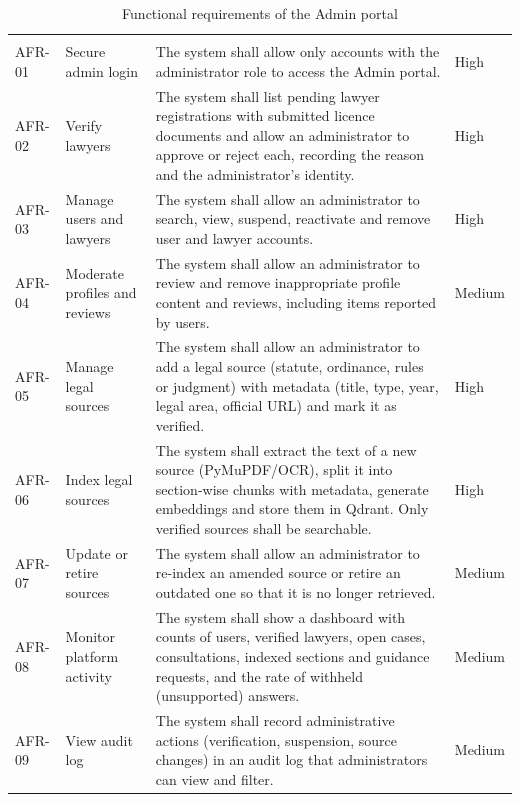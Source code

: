 \begin{longtable}{|L{1.62cm}|L{2.57cm}|L{8.12cm}|L{1.70cm}|}
\caption{Functional requirements of the Admin portal}\label{tab:3.3}\\
\hline\headrow {} &  &  &  \\ \hline
\endfirsthead
\hline\headrow {} &  &  &  \\ \hline
\endhead
\hline\endlastfoot
AFR-01 & Secure admin login & The system shall allow only accounts with the administrator role to access the Admin portal. & High \\ \hline
AFR-02 & Verify lawyers & The system shall list pending lawyer registrations with submitted licence documents and allow an administrator to approve or reject each, recording the reason and the administrator's identity. & High \\ \hline
AFR-03 & Manage users and lawyers & The system shall allow an administrator to search, view, suspend, reactivate and remove user and lawyer accounts. & High \\ \hline
AFR-04 & Moderate profiles and reviews & The system shall allow an administrator to review and remove inappropriate profile content and reviews, including items reported by users. & Medium \\ \hline
AFR-05 & Manage legal sources & The system shall allow an administrator to add a legal source (statute, ordinance, rules or judgment) with metadata (title, type, year, legal area, official URL) and mark it as verified. & High \\ \hline
AFR-06 & Index legal sources & The system shall extract the text of a new source (PyMuPDF/OCR), split it into section-wise chunks with metadata, generate embeddings and store them in Qdrant. Only verified sources shall be searchable. & High \\ \hline
AFR-07 & Update or retire sources & The system shall allow an administrator to re-index an amended source or retire an outdated one so that it is no longer retrieved. & Medium \\ \hline
AFR-08 & Monitor platform activity & The system shall show a dashboard with counts of users, verified lawyers, open cases, consultations, indexed sections and guidance requests, and the rate of withheld (unsupported) answers. & Medium \\ \hline
AFR-09 & View audit log & The system shall record administrative actions (verification, suspension, source changes) in an audit log that administrators can view and filter. & Medium \\
\end{longtable}

